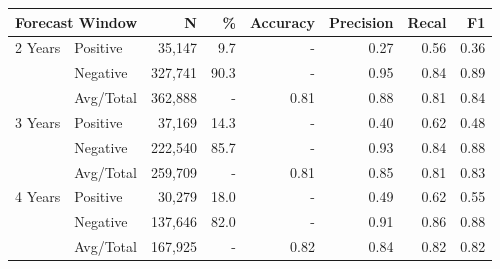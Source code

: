 \begin{tabular}{llrrrrrr} \toprule
\multicolumn{2}{l}{Forecast Window}
              & N       & \%   & Accuracy  & Precision  & Recal  & F1   \\ \midrule
2 Years & Positive & 35,147  & 9.7  & -    & 0.27 & 0.56 & 0.36 \\
        & Negative & 327,741 & 90.3 & -    & 0.95 & 0.84 & 0.89 \\
        & Avg/Total & 362,888 & -    & 0.81 & 0.88 & 0.81 & 0.84 \\ \midrule
3 Years & Positive & 37,169  & 14.3 & -    & 0.40 & 0.62 & 0.48 \\
        & Negative & 222,540 & 85.7 & -    & 0.93 & 0.84 & 0.88 \\
        & Avg/Total & 259,709 & -    & 0.81 & 0.85 & 0.81 & 0.83 \\ \midrule
4 Years & Positive & 30,279  & 18.0 & -    & 0.49 & 0.62 & 0.55 \\
        & Negative & 137,646 & 82.0 & -    & 0.91 & 0.86 & 0.88 \\
        & Avg/Total & 167,925 & -    & 0.82 & 0.84 & 0.82 & 0.82 \\
\bottomrule \end{tabular}
